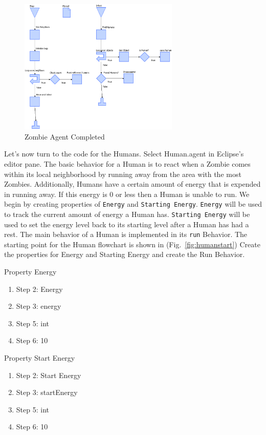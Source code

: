 \documentclass[11pt]{amsart}
\begin{document}
\begin{figure}[p]
\begin{center}
\vspace{.2in}
\centerline {
\includegraphics[width=3in]{figs/Zombie_complete.eps}
}
\caption{Zombie Agent Completed}
\label{fig:zombieComplete}
\end{center}
\end{figure}

\FloatBarrier

Let's now turn to the code for the Humans. Select Human.agent in Eclipse's editor pane. The basic behavior for a Human is to react when a Zombie comes within its local neighborhood by running away from the area with the most Zombies. Additionally, Humans have  a certain amount of energy that is expended in running away. If this energy is 0 or less then a Human is unable to run. We begin by creating properties of \texttt{Energy} and \texttt{Starting Energy}. \texttt{Energy} will be used to track the current amount of energy a Human has.  \texttt{Starting Energy} will be used to set the energy level back to its starting level after a Human has had a rest.  The main behavior of a Human is implemented in its \texttt{run} Behavior.  The starting point for the Human flowchart is shown in (Fig.~\ref{fig:humanstart})  Create the properties for Energy and Starting Energy and create the Run Behavior.

Property Energy
\begin{enumerate}
 \item Step 2: Energy
 \item Step 3: energy 
 \item Step 5: int
 \item Step 6: 10
\end{enumerate}

Property Start Energy
\begin{enumerate}
 \item Step 2: Start Energy
 \item Step 3: startEnergy
 \item Step 5: int
 \item Step 6: 10
\end{enumerate}
\end{document}
